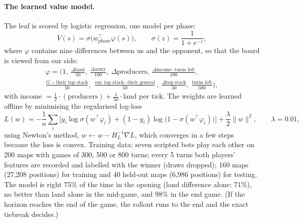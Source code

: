 \paragraph{The learned value model.} The leaf is scored by logistic regression, one model per phase:
\begin{equation}
V(s)=\sigma\big(w_{\text{phase}}^{\top}\varphi(s)\big),\qquad \sigma(z)=\frac{1}{1+e^{-z}},
\end{equation}
where $\varphi$ contains nine differences between us and the opponent, so that the board is viewed from our
side:
\begin{multline*}
\varphi=\Big(1,\ \tfrac{\Delta\text{land}}{50},\ \tfrac{\Delta\text{army}}{100},\ \Delta\text{producers},\
\tfrac{\Delta\text{income}\cdot\text{turns left}}{100},\\
\tfrac{G-\text{their top stack}}{50},\ \tfrac{\text{our top stack}-\text{their general}}{50},\
\tfrac{\Delta\text{top stack}}{50},\ \tfrac{\text{turns left}}{500}\Big),
\end{multline*}
with income $=\tfrac12\cdot(\text{producers})+\tfrac{1}{50}\cdot\text{land}$ per tick. The weights are learned
offline by minimising the regularised log-loss
\begin{equation}
L(w)=-\frac{1}{n}\sum_i\Big[y_i\log\sigma(w^{\top}\varphi_i)+(1-y_i)\log\big(1-\sigma(w^{\top}\varphi_i)\big)\Big]+\frac{\lambda}{2}\|w\|^2,\qquad\lambda=0.01,
\end{equation}
using Newton's method, $w\leftarrow w-H_L^{-1}\nabla L$, which converges in a few steps because the loss is
convex. Training data: seven scripted bots play each other on 200 maps with games of 300, 500 or 800 turns;
every 5 turns both players' features are recorded and labelled with the winner (draws dropped); 160 maps
(27,208 positions) for training and 40 held-out maps (6,986 positions) for testing. The model is right 75\% of
the time in the opening (land difference alone: 71\%), no better than land alone in the mid-game, and 98\% in
the end game. (If the horizon reaches the end of the game, the rollout runs to the end and the exact tiebreak
decides.)

